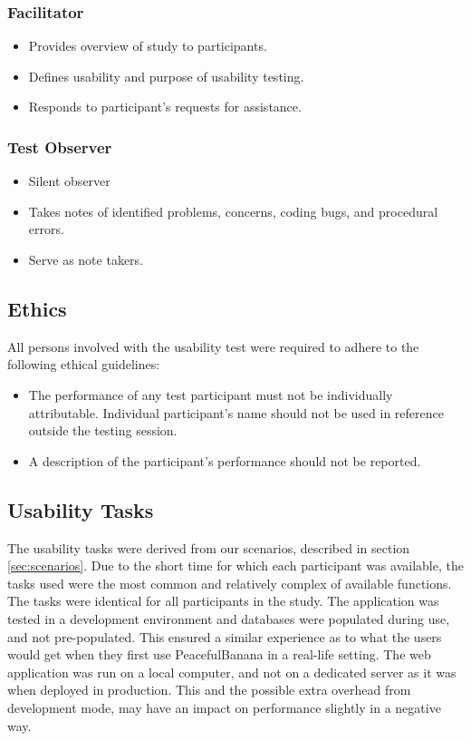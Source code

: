 \subsubsection{Facilitator}
	\begin{itemize}
		\item Provides overview of study to participants.
		\item Defines usability and purpose of usability testing.
		\item Responds to participant's requests for assistance.
	\end{itemize}
\subsubsection{Test Observer}
	\begin{itemize}
		\item Silent observer
		\item Takes notes of identified problems, concerns, coding bugs, and procedural errors.
		\item Serve as note takers.
	\end{itemize}

\subsection{Ethics}
All persons involved with the usability test were required to adhere to the following ethical guidelines:
\begin{itemize}
	\item The performance of any test participant must not be individually attributable. Individual participant's name should not be used in reference outside the testing session.
	\item A description of the participant's performance should not be reported. 
\end{itemize}

\subsection{Usability Tasks}
The usability tasks were derived from our scenarios, described in section \ref{sec:scenarios}. Due to the short time for which each participant was available, the tasks used were the most common and relatively complex of available functions. The tasks were identical for all participants in the study.
The application was tested in a development environment and databases were populated during use, and not pre-populated. This ensured a similar experience as to what the users would get when they first use PeacefulBanana in a real-life setting. The web application was run on a local computer, and not on a dedicated server as it was when deployed in production. This and the possible extra overhead from development mode, may have an impact on performance slightly in a negative way.


